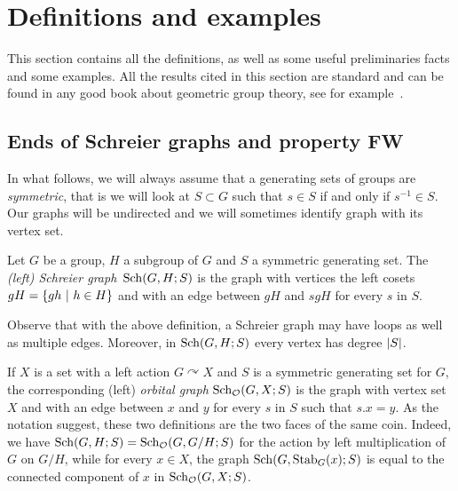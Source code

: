 %
%
%
%
%
%
%
%
%
%
\section{Definitions and examples}
This section contains all the definitions, as well as some useful preliminaries facts and some examples.
All the results cited in this section are standard and can be found in any good book about geometric group theory, see for example~\cite{DelaHarpe2000}. 
%
%
%
%
%
%
%
%
%
%
\subsection{Ends of Schreier graphs and property FW}
\label{Subsection:FW}
%
%
%
%
%
In what follows, we will always assume that a generating sets of groups are \emph{symmetric}, that is we will look at $S\subset G$ such that $s\in S$ if and only if $s^{-1}\in S$.
Our graphs will be undirected and we will sometimes identify  graph with its vertex set.
%
%
\begin{defn}
Let $G$ be a group, $H$ a subgroup of $G$ and $S$ a symmetric generating set. The \emph{(left) Schreier graph} $\operatorname{Sch}(G,H;S)$ is the graph with vertices the left cosets $gH=\{gh\ |\ h\in H\}$ and with an edge between $gH$ and $sgH$ for every $s$ in $S$.
\end{defn}
%
%
Observe that with the above definition, a Schreier graph may have loops as well as multiple edges. Moreover, in $\operatorname{Sch}(G,H;S)$ every vertex has degree $\lvert S\rvert$.

If $X$ is a set with a left action $G\curvearrowright X$ and $S$ is a symmetric generating set for $G$, the corresponding (left) \emph{orbital graph} $\operatorname{Sch}_{\mathcal O}(G,X;S)$ is the graph with vertex set $X$ and with an edge between $x$ and $y$ for every $s$ in $S$ such that $s.x=y$.
As the notation suggest, these two definitions are the two faces of the same coin. Indeed, we have $\operatorname{Sch}(G,H;S)=\operatorname{Sch}_{\mathcal O}(G,G/H;S)$ for the  action by left multiplication of $G$ on $G/H$, while   for every $x\in X$, the graph $\operatorname{Sch}(G,\operatorname{Stab}_G(x);S)$ is equal to the connected component of $x$ in $\operatorname{Sch}_{\mathcal O}(G,X;S)$.

